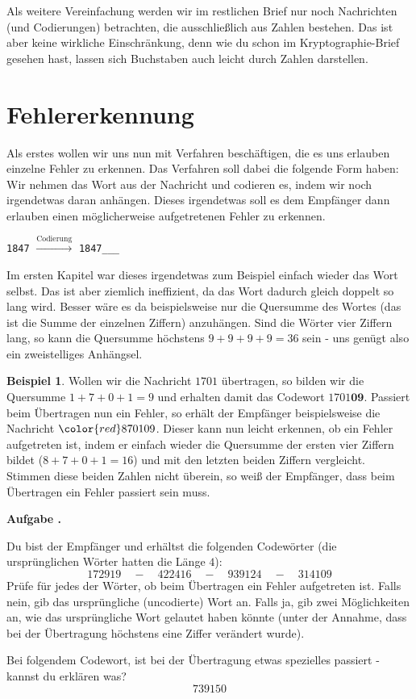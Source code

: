 \documentclass[a4paper,ngerman,12pt]{scrartcl}
\newcommand{\red}[1]{{\color{red}#1}}
\theoremstyle{definition}
\newtheorem{bsp}[defn]{Beispiel}
\theoremstyle{plain}
\theoremstyle{remark}
\newlength{\aufgabenskip}
\newcounter{aufgabennummer}
\newenvironment{aufgabe}[1]{
	\addtocounter{aufgabennummer}{1}
	\textbf{Aufgabe \theaufgabennummer.} \emph{#1} \par
}{\vspace{\aufgabenskip}}
\begin{document}
Als weitere Vereinfachung werden wir im restlichen Brief nur noch Nachrichten (und Codierungen) betrachten, die ausschließlich aus Zahlen bestehen. Das ist aber keine wirkliche Einschränkung, denn wie du schon im Kryptographie-Brief gesehen hast, lassen sich Buchstaben auch leicht durch Zahlen darstellen.


\section{Fehlererkennung}

Als erstes wollen wir uns nun mit Verfahren beschäftigen, die es uns erlauben einzelne Fehler zu erkennen. Das Verfahren soll dabei die folgende Form haben: Wir nehmen das Wort aus der Nachricht und codieren es, indem wir noch \glqq irgendetwas\grqq{} daran anhängen. Dieses \glqq irgendetwas\grqq{} soll es dem Empfänger dann erlauben einen möglicherweise aufgetretenen Fehler zu erkennen.
	\begin{center}
		\texttt{1847} $\xrightarrow{\text{Codierung}}$ \texttt{1847\_\_\_}
	\end{center}

Im ersten Kapitel war dieses \glqq irgendetwas\grqq{} zum Beispiel einfach wieder das Wort selbst. Das ist aber ziemlich ineffizient, da das Wort dadurch gleich doppelt so lang wird. Besser wäre es da beispielsweise nur die Quersumme des Wortes (das ist die Summe der einzelnen Ziffern) anzuhängen. Sind die Wörter vier Ziffern lang, so kann die Quersumme höchstens $9+9+9+9=36$ sein - uns genügt also ein zweistelliges Anhängsel.

\begin{bsp}
	Wollen wir die Nachricht $1701$ übertragen, so bilden wir die Quersumme $1+7+0+1=9$ und erhalten damit das Codewort $1701\textbf{09}$. Passiert beim Übertragen nun ein Fehler, so erhält der Empfänger beispielsweise die Nachricht $\red{8}70109$. Dieser kann nun leicht erkennen, ob ein Fehler aufgetreten ist, indem er einfach wieder die Quersumme der ersten vier Ziffern bildet ($8+7+0+1=16$) und mit den letzten beiden Ziffern vergleicht. Stimmen diese beiden Zahlen nicht überein, so weiß der Empfänger, dass beim Übertragen ein Fehler passiert sein muss.
\end{bsp}

\begin{aufgabe}{}
	Du bist der Empfänger und erhältst die folgenden Codewörter (die ursprünglichen Wörter hatten die Länge $4$):
		\[172919 \quad-\quad 422416 \quad-\quad 939124  \quad-\quad 314109\]
	Prüfe für jedes der Wörter, ob beim Übertragen ein Fehler aufgetreten ist. Falls nein, gib das ursprüngliche (uncodierte) Wort an. Falls ja, gib zwei Möglichkeiten an, wie das ursprüngliche Wort gelautet haben könnte (unter der Annahme, dass bei der Übertragung höchstens eine Ziffer verändert wurde). 
	
	Bei folgendem Codewort, ist bei der Übertragung etwas spezielles passiert - kannst du erklären was?
		\[739150\]
\end{aufgabe}
\end{document}
